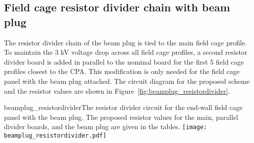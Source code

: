 \subsection{Field cage resistor divider chain with beam plug}
The resistor divider chain of the beam plug is tied to the main field cage profile. To maintain the 3 kV voltage drop across all field cage profiles, a second resistor divider board is added in parallel to the nominal board for the first 5 field cage profiles closest to the CPA. This modification is only needed for the field cage panel with the beam plug attached. The circuit diagram for the proposed scheme and the resistor values are shown in Figure~\ref{fig:beamplug_resistordivider}.
\begin{cdrfigure}{beamplug_resistordivider}{The resistor divider circuit for the end-wall field cage panel with the beam plug. The proposed resistor values for the main, parallel divider boards, and the beam plug are given in the tables.}
  \texttt{[image: beamplug\_resistordivider.pdf]}
\end{cdrfigure}




